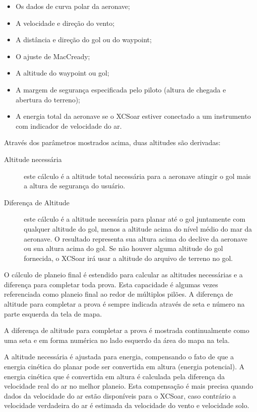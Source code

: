\begin{itemize}
\item Os dados de curva polar da aeronave;
\item A velocidade e direção do vento;
\item A distância e direção do gol ou do waypoint;
\item O ajuste de MacCready;
\item A altitude do waypoint ou gol;
\item A margem de segurança especificada pelo piloto (altura de chegada e abertura do terreno);
\item A energia total da aeronave se o XCSoar estiver conectado a um instrumento com indicador de velocidade do ar.
\end{itemize}

Através dos parâmetros mostrados acima, duas altitudes são derivadas:
\begin{description}
\item[Altitude necessária]
este cálculo é a altitude total necessária para a aeronave atingir o gol mais a altura de segurança do usuário.
\item[Diferença de Altitude]
este cálculo é a altitude necessária para planar até o gol juntamente com qualquer altitude do gol, menos a altitude acima do nível médio do mar da aeronave.  O resultado representa sua altura acima do declive da aeronave ou sua altura acima do gol.  Se não houver alguma altitude do gol fornecida, o XCSoar irá usar a altitude do arquivo de terreno no gol.
\end{description}

O cálculo de planeio final é estendido para calcular as altitudes necessárias e a diferença para completar toda prova.  Esta capacidade é algumas vezes referenciada como planeio final ao redor de múltiplos pilões.  
A diferença de altitude para completar a prova é sempre indicada através de seta e número na parte esquerda da tela de mapa.

A diferença de altitude para completar a prova é mostrada continualmente como uma seta e em forma numérica no lado esquerdo da área do mapa na tela.

A altitude necessária é ajustada para energia, compensando o fato de que a energia cinética do planar pode ser convertida em altura (energia potencial).  A energia cinética que é convertida em altura é calculada pela diferença da velocidade real do ar no melhor planeio.  Esta compensação é mais precisa quando dados da velocidade do ar estão disponíveis para o XCSoar, caso contrário a velocidade verdadeira do ar é estimada da velocidade do vento e velocidade solo.


